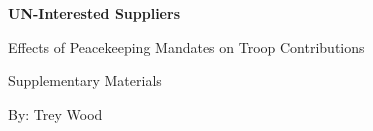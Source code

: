 \begin{titlepage}
	\begin{center}
		\vspace*{1cm}
		\huge %
		\textbf{UN-Interested Suppliers}
		
		\vspace{0.25cm}
		\LARGE
		Effects of Peacekeeping Mandates on Troop Contributions
		
	\vspace{1cm}

	Supplementary Materials

	\vspace{1cm}
	\Large

	\vspace{1cm}
	\Large
	By: Trey Wood

	\vspace{1cm}

\begin{comment}

	\begin{figure}[h]
	\begin{center}
	\texttt{[image: Screen Shot 2021-08-26 at 4.53.11 PM.png]}
	\end{center}
	\end{figure}

\end{comment}
	
	\vfill
	
	\end{center}
\end{titlepage}